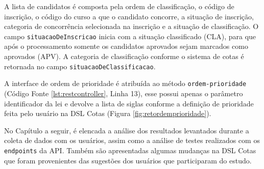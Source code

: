 A lista de candidatos é composta pela ordem de classificação, o código de inscrição, o código do curso a que o candidato concorre, a situação de inscrição, categoria de concorrência selecionada na inscrição e a situação de classificação. O campo \texttt{situacaoDeInscricao} inicia com a situação classificado (CLA), para que após o processamento somente os candidatos aprovados sejam marcados como aprovados (APV). A categoria de classificação conforme o sistema de cotas é retornada no campo \texttt{situacaoDeClassificacao}.

\newpage
A interface de ordem de prioridade é atribuída ao método \texttt{ordem-prioridade} (Código Fonte \ref{lst:restcontroller}, Linha 13), esse possui apenas o parâmetro identificador da lei e devolve a lista de siglas conforme a definição de prioridade feita pelo usuário na DSL Cotas (Figura \ref{fig:retordemprioridade}).



\newpage
No Capítulo a seguir, é elencada a análise dos resultados levantados durante a coleta de dados com os usuários, assim como a análise de testes realizados com os \texttt{endpoints} da API. Também são apresentadas algumas mudanças na DSL Cotas que foram provenientes das sugestões dos usuários que participaram do estudo.